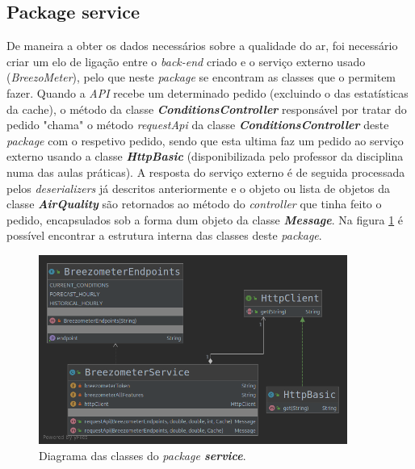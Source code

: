 \subsection{Package service}
De maneira a obter os dados necessários sobre a qualidade do ar, foi necessário criar um elo de ligação entre o \textit{back-end} criado e o serviço externo usado (\textit{BreezoMeter}), pelo que neste \textit{package} se encontram as classes que o permitem fazer. Quando a \textit{API} recebe um determinado pedido (excluindo o das estatísticas da cache), o método da classe \textbf{\textit{ConditionsController}} responsável por tratar do pedido "chama" o método \textit{requestApi} da classe \textbf{\textit{ConditionsController}} deste \textit{package} com o respetivo pedido, sendo que esta ultima faz um pedido ao serviço externo usando a classe \textbf{\textit{HttpBasic}} (disponibilizada pelo professor da disciplina numa das aulas práticas). A resposta do serviço externo é de seguida processada pelos \textit{deserializers} já descritos anteriormente e o objeto ou lista de objetos da classe \textbf{\textit{AirQuality}} são retornados ao método do \textit{controller} que tinha feito o pedido, encapsulados sob a forma dum objeto da classe \textbf{\textit{Message}}. Na figura \ref{fig:service_diagram} é possível encontrar a estrutura interna das classes deste \textit{package}.

\begin{figure}[h]
   \centering
   \includegraphics[width=0.90\textwidth]{images/service_diagram}
   \caption{Diagrama das classes do \textit{package \textbf{service}}.}
   \label{fig:service_diagram}
\end{figure}
